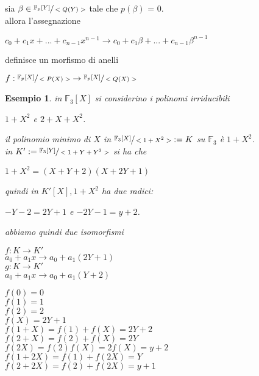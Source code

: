 \documentclass[a4paper,12pt]{article}
\theoremstyle{def}
\theoremstyle{prop}
\theoremstyle{esempio}
\newtheorem*{example}{Esempio}
\theoremstyle{dimostrazione}
\theoremstyle{teo}
\theoremstyle{osservazione}
\begin{document}
\vspace{\baselineskip}

sia \(\beta \in \sfrac{\mathbb{F}_p[Y]}{<Q(Y)>}\) tale che \(p(\beta)\) = 0.\\
allora l'assegnazione
\begin{center}
	\(c_0 + c_1 x + ... + c_{n-1} x^{n-1} \rightarrow c_0 + c_1 \beta + ... + c_{n-1} \beta^{n-1}\)
\end{center}
definisce un morfismo di anelli
\begin{center}
	\(f: \sfrac{\mathbb{F}_p[X]}{<P(X)>} \rightarrow \sfrac{\mathbb{F}_p[X]}{<Q(X)>}\)
\end{center}

\newpage

\begin{example}
	in \(\mathbb{F}_3[X]\) si considerino i polinomi irriducibili 
	\begin{center}
		\(1 + X^2\) e \(2 + X + X^2\).
	\end{center}
	il polinomio minimo di \(X\) in \(\sfrac{\mathbb{F}_3[X]}{<1 + X^2 >} := K\) su \(\mathbb{F}_3\) è \(1 + X^2\).\\
	in \(K' := \sfrac{\mathbb{F}_3[Y]}{<1 + Y + Y^2>}\) si ha che 
	\begin{center}
		\(1 + X^2 = (X + Y + 2)(X + 2Y + 1)\)
	\end{center}
	quindi in \(K'[X], 1 + X^2\) ha due radici:
	\begin{center}
		\(-Y-2 = 2Y+1\) e \(-2Y - 1 = y + 2\).
	\end{center}
	abbiamo quindi due isomorfismi
	\begin{center}
		\(f: K \rightarrow K'\)\\
		\(a_0 + a_1x \rightarrow a_0 + a_1(2Y + 1)\)\\
		\(g: K \rightarrow K'\)\\
		\(a_0 + a_1x \rightarrow a_0 + a_1(Y + 2)\)\\
	\end{center}
	\(f(0) = 0\)\\
	\(f(1) = 1\)\\
	\(f(2) = 2\)\\
	\(f(X) = 2Y + 1\)\\
	\(f(1 + X) = f(1) + f(X) = 2Y + 2\)\\
	\(f(2 + X) = f(2) + f(X) = 2Y\)\\
	\(f(2X) = f(2)f(X) = 2f(X) = y + 2\)\\
	\(f(1 + 2X) = f(1) + f(2X) = Y\)\\
	\(f(2 + 2X) = f(2) + f(2X) = y + 1\) \vspace{\baselineskip}\\

\end{example}
\end{document}
